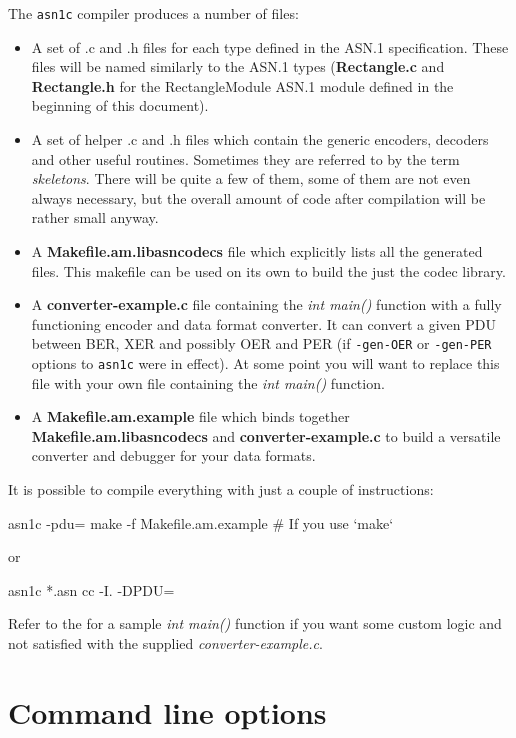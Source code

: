 \documentclass[english,oneside,12pt]{book}
\newcommand{\cmd}[1]{\texttt{#1}}
\begin{document}
The \cmd{asn1c} compiler produces a number of files:
\begin{itemize}
\item A set of .c and .h files for each type defined
in the ASN.1 specification. These files will be named similarly to
the ASN.1 types (\textbf{Rectangle.c} and \textbf{Rectangle.h} for the
RectangleModule ASN.1 module defined in the beginning of this document).
\item A set of helper .c and .h files which contain the generic encoders,
decoders and other useful routines.
Sometimes they are referred to by the term \emph{skeletons}.
There will be quite a few of them, some
of them are not even always necessary, but the overall amount of code
after compilation will be rather small anyway.
\item A \textbf{Makefile.am.libasncodecs} file which explicitly lists all the
generated files.
This makefile can be used on its own to build the just the codec library.
\item A \textbf{converter-example.c} file containing the \emph{int main()} function with a fully functioning encoder and data format converter. It can convert a given PDU between BER, XER and possibly OER and PER (if \cmd{-gen-OER} or \cmd{-gen-PER} options to \cmd{asn1c} were in effect). At some point you will want to replace this file with your own file containing the \emph{int main()} function.
\item A \textbf{Makefile.am.example} file which binds together
\textbf{Makefile.am.libasncodecs} and \textbf{converter-example.c}
to build a versatile converter and debugger for your data formats.
\end{itemize}
It is possible to compile everything with just a couple of instructions:
\begin{bash}
asn1c -pdu=%
make -f Makefile.am.example                   # If you use `make`
\end{bash}
or
\begin{bash}
asn1c *.asn
cc -I. -DPDU=%
\end{bash}
Refer to the  for a sample
\emph{int main()} function if you want some custom logic and not satisfied
with the supplied \emph{converter-example.c}.

\clearpage{}
\section{\label{sec:Command-line-options}Command line options}
\end{document}
